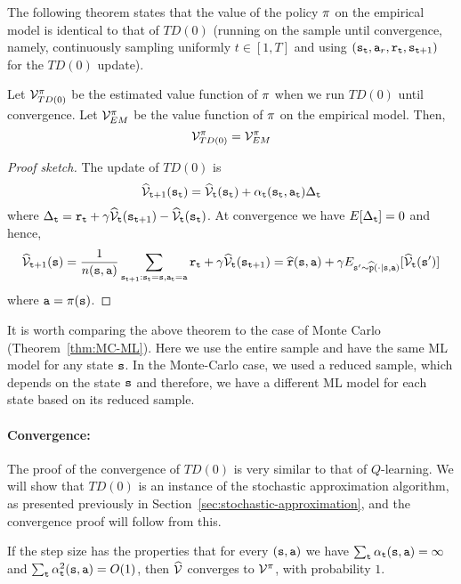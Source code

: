 The following theorem states that the value of the policy $\pi$ on 
the empirical model is identical to that of $TD(0)$ (running on the
sample until convergence, namely, continuously sampling uniformly
$t\in[1,T]$ and using $({\tt s}_{\tt t},
{\tt a}_r,{\tt r}_{\tt t},{\tt s}_{{\tt t}+1})$ for the $TD(0)$
update).

\begin{theorem}
Let $\mathcal{V}^\pi_{TD(0)}$ be the estimated value function of
$\pi$ when we run $TD(0)$ until convergence. Let
$\mathcal{V}^\pi_{EM}$ be the value function of $\pi$ on the
empirical model. Then, \[\mathcal{V}^\pi_{TD(0)}=\mathcal{V}^\pi_{EM}\]
\end{theorem}

\begin{proof}[Proof sketch]
The update of $TD(0)$ is
\[\widehat{\mathcal{V}}_{{\tt t}+1}({\tt s}_{\tt t})=\widehat{\mathcal{V}}_{{\tt t}}({\tt s}_{\tt t})+\alpha_{\tt t}({\tt s}_{\tt t},{\tt a}_{\tt t})\Delta_{\tt t}\]
where $\Delta_{\tt t}={\tt r}_{\tt t}+\gamma
\widehat{\mathcal{V}}_{{\tt t}}({\tt s}_{{\tt t}+1})-\widehat{\mathcal{V}}_{{\tt t}}({\tt s}_{\tt t})$. At
convergence we have $E[\Delta_{\tt t}]=0$ and hence,
\[
\widehat{\mathcal{V}}_{{\tt t}+1}({\tt s})=\frac{1}{n({\tt s},{\tt a})}\sum_{{\tt s}_{{\tt t}+1}:{\tt s}_{\tt t}={\tt s},{\tt a}_{\tt t}={\tt a}}
{\tt r}_{\tt t}+\gamma
\widehat{\mathcal{V}}_{{\tt t}}({\tt s}_{{\tt t}+1})=\widehat{{\tt r}}({\tt s},{\tt a})+\gamma
E_{{\tt s}'\sim
\widehat{{\tt p}}(\cdot|{\tt s},{\tt a})}[\widehat{\mathcal{V}}_{{\tt t}}({\tt s}')]
\]
where ${\tt a}=\pi({\tt s})$.
\end{proof}

It is worth comparing the above theorem to the case of Monte Carlo
(Theorem~\ref{thm:MC-ML}). Here we use the entire sample and
have the same ML model for any state ${\tt s}$. In the Monte-Carlo
case, we used a reduced sample, which depends on the state ${\tt s}$
and therefore, we have a different ML model for each state based on
its reduced sample.

\paragraph{Convergence:} The proof of the convergence of $TD(0)$ is very
similar to that of $Q$-learning. We will show that $TD(0)$ is an
instance of the stochastic approximation algorithm, as presented
previously in Section~\ref{sec:stochastic-approximation}, and the
convergence proof will follow from this.

\begin{theorem}[Convergence $TD(0)$]
\label{thm:TD0-conrg} If the step size has the properties that for
every $({\tt s},{\tt a})$ we have $\sum_{\tt t}
\alpha_{\tt t}({\tt s},{\tt a})=\infty $ and $\sum_{\tt t}
\alpha_{\tt t}^2({\tt s},{\tt a})=O(1)$, then $\widehat{\mathcal{V}}$ converges
to $\mathcal{V}^\pi$, with probability $1$.
\end{theorem}

